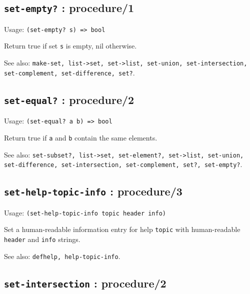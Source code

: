 \documentclass[
]{article}
\newcommand{\passthrough}[1]{#1}
\begin{document}
\hypertarget{set-empty-procedure1-1}{%
\subsection{\texorpdfstring{\texttt{set-empty?} :
procedure/1}{set-empty? : procedure/1}}\label{set-empty-procedure1-1}}

Usage: \passthrough{\lstinline!(set-empty? s) => bool!}

Return true if set \passthrough{\lstinline!s!} is empty, nil otherwise.

See also:
\passthrough{\lstinline!make-set, list->set, set->list, set-union, set-intersection, set-complement, set-difference, set?!}.

\hypertarget{set-equal-procedure2-1}{%
\subsection{\texorpdfstring{\texttt{set-equal?} :
procedure/2}{set-equal? : procedure/2}}\label{set-equal-procedure2-1}}

Usage: \passthrough{\lstinline!(set-equal? a b) => bool!}

Return true if \passthrough{\lstinline!a!} and
\passthrough{\lstinline!b!} contain the same elements.

See also:
\passthrough{\lstinline!set-subset?, list->set, set-element?, set->list, set-union, set-difference, set-intersection, set-complement, set?, set-empty?!}.

\hypertarget{set-help-topic-info-procedure3-1}{%
\subsection{\texorpdfstring{\texttt{set-help-topic-info} :
procedure/3}{set-help-topic-info : procedure/3}}\label{set-help-topic-info-procedure3-1}}

Usage: \passthrough{\lstinline!(set-help-topic-info topic header info)!}

Set a human-readable information entry for help
\passthrough{\lstinline!topic!} with human-readable
\passthrough{\lstinline!header!} and \passthrough{\lstinline!info!}
strings.

See also: \passthrough{\lstinline!defhelp, help-topic-info!}.

\hypertarget{set-intersection-procedure2-1}{%
\subsection{\texorpdfstring{\texttt{set-intersection} :
procedure/2}{set-intersection : procedure/2}}\label{set-intersection-procedure2-1}}
\end{document}
